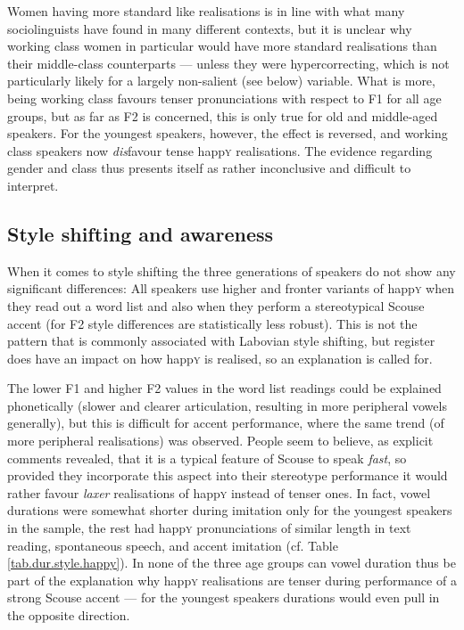Women having more standard like realisations is in line with what many sociolinguists have found in many different contexts, but it is unclear why working class women in particular would have more standard realisations than their middle-class counterparts --- unless they were hypercorrecting, which is not particularly likely for a largely non-salient (see below) variable.
What is more, being working class favours tenser pronunciations with respect to F1 for all age groups, but as far as F2 is concerned, this is only true for old and middle-aged speakers.
For the youngest speakers, however, the effect is reversed, and working class speakers now \emph{dis}favour tense happ\textsc{y} realisations.
The evidence regarding gender and class thus presents itself as rather inconclusive and difficult to interpret.

\subsection{Style shifting and awareness}
\label{prod.disc.happy.style}

When it comes to style shifting the three generations of speakers do not show any significant differences: All speakers use higher and fronter variants of happ\textsc{y} when they read out a word list and also when they perform a stereotypical Scouse accent (for F2 style differences are statistically less robust).
This is not the pattern that is commonly associated with Labovian style shifting, but register does have an impact on how happ\textsc{y} is realised, so an explanation is called for.

The lower F1 and higher F2 values in the word list readings could be explained phonetically (slower and clearer articulation, resulting in more peripheral vowels generally), but this is difficult for accent performance, where the same trend (of more peripheral realisations) was observed.
People seem to believe, as explicit comments revealed, that it is a typical feature of Scouse to speak \emph{fast}, so provided they incorporate this aspect into their stereotype performance it would rather favour \emph{laxer} realisations of happ\textsc{y} instead of tenser ones.
In fact, vowel durations were somewhat shorter during imitation only for the youngest speakers in the sample, the rest had happ\textsc{y} pronunciations of similar length in text reading, spontaneous speech, and accent imitation (cf. Table \ref{tab.dur.style.happy}).
In none of the three age groups can vowel duration thus be part of the explanation why happ\textsc{y} realisations are tenser during performance of a strong Scouse accent --- for the youngest speakers durations would even pull in the opposite direction.

